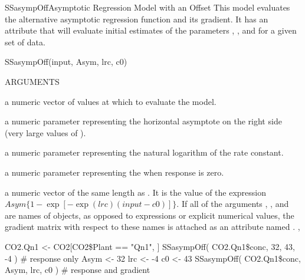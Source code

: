 \documentclass[pdftex]{article} \usepackage{url,graphicx}
\begin{document}
\begin{Helpfile}{SSasympOff}{Asymptotic Regression Model with an Offset}
This  model evaluates the alternative asymptotic
regression function and its gradient.  It has an 
attribute that will evaluate initial estimates of the parameters
, , and   for a given set of data.
\begin{Example}
SSasympOff(input, Asym, lrc, c0)
\end{Example}
\begin{Argument}{ARGUMENTS}
\item[\Co{input:}]
a numeric vector of values at which to evaluate the model.
\item[\Co{Asym:}]
a numeric parameter representing the horizontal asymptote on
the right side (very large values of ).
\item[\Co{lrc:}]
a numeric parameter representing the natural logarithm of
the rate constant.
\item[\Co{c0:}]
a numeric parameter representing the  when
response is zero.
\end{Argument}
a numeric vector of the same length as .  It is the value of
the expression $Asym\{1 - \exp[-\exp(lrc)(input - c0)]\}$.  If all of
the arguments , , and  are
names of objects, as opposed to expressions or explicit numerical
values, the gradient matrix with respect to these names is attached as
an attribute named .
, 
\need 15pt
\vspace{-16pt} 
\begin{Example}
CO2.Qn1 <- CO2[CO2\$Plant == "Qn1", ]
SSasympOff( CO2.Qn1\$conc, 32, 43, -4 )  # response only
Asym <- 32
lrc <- -4
c0 <- 43
SSasympOff( CO2.Qn1\$conc, Asym, lrc, c0 ) # response and gradient
\end{Example}
\end{Helpfile}
\end{document}
